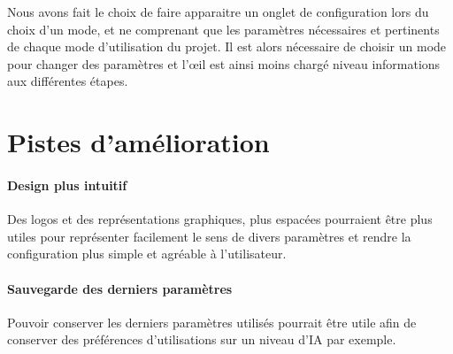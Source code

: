\documentclass{scrreprt}
\begin{document}
			
			Nous avons fait le choix de faire apparaitre un onglet de configuration lors du choix d'un mode, et ne comprenant que les paramètres nécessaires et pertinents de chaque mode d'utilisation du projet. Il est alors nécessaire de choisir un mode pour changer des paramètres et l'œil est ainsi moins chargé niveau informations aux différentes étapes.
			
		\section{Pistes d'amélioration}
			\paragraph{Design plus intuitif}
			
			Des logos et des représentations graphiques, plus espacées pourraient être plus utiles pour représenter facilement le sens de divers paramètres et rendre la configuration plus simple et agréable à l'utilisateur.
			
			\paragraph{Sauvegarde des derniers paramètres}
			
			Pouvoir conserver les derniers paramètres utilisés pourrait être utile afin de conserver des préférences d'utilisations sur un niveau d'IA par exemple.
			

\end{document}
